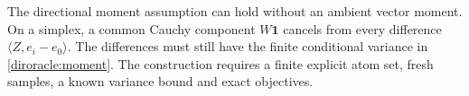The directional moment assumption can hold without an ambient vector
moment. On a simplex, a common Cauchy component $W\mathbf1$ cancels
from every difference $\langle Z,e_i-e_0\rangle$. The differences
must still have the finite conditional variance in
\eqref{diroracle:moment}. The construction requires a finite explicit
atom set, fresh samples, a known variance bound and exact objectives.
